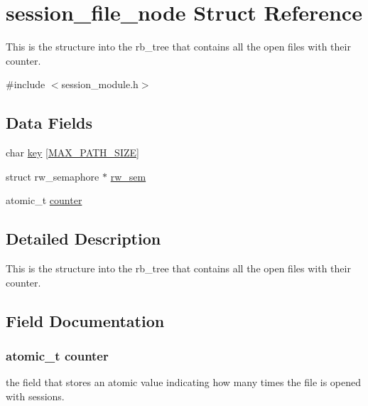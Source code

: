\hypertarget{structsession__file__node}{}\section{session\+\_\+file\+\_\+node Struct Reference}
\label{structsession__file__node}


This is the structure into the rb\+\_\+tree that contains all the open files with their counter.  




{\ttfamily \#include $<$session\+\_\+module.\+h$>$}

\subsection*{Data Fields}
\begin{DoxyCompactItemize}
\item 
char \hyperlink{structsession__file__node_ae4c213ccac480eb9759b4c5fc70ac77f}{key} \mbox{[}\hyperlink{session__module_8h_a4620eb783fd7aaa1d61fe4fdaa750d74}{M\+A\+X\+\_\+\+P\+A\+T\+H\+\_\+\+S\+I\+ZE}\mbox{]}
\item 
struct rw\+\_\+semaphore $\ast$ \hyperlink{structsession__file__node_a0eba6b6e0bbe3d55110a724c3c08d1c2}{rw\+\_\+sem}
\item 
atomic\+\_\+t \hyperlink{structsession__file__node_a73c22c7a38a683b4a26d2f1f2308b80d}{counter}
\end{DoxyCompactItemize}


\subsection{Detailed Description}
This is the structure into the rb\+\_\+tree that contains all the open files with their counter. 

\subsection{Field Documentation}
\subsubsection[{\texorpdfstring{counter}{counter}}]{\setlength{\rightskip}{0pt plus 5cm}atomic\+\_\+t counter}\hypertarget{structsession__file__node_a73c22c7a38a683b4a26d2f1f2308b80d}{}\label{structsession__file__node_a73c22c7a38a683b4a26d2f1f2308b80d}
the field that stores an atomic value indicating how many times the file is opened with sessions. 
